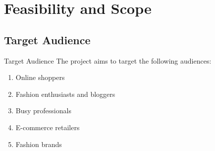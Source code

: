 \section{Feasibility and Scope}

\subsection{Target Audience}
\begin{frame}{Target Audience}
	The project aims to target the following audiences:
	\begin{enumerate}
		\item Online shoppers
		\item Fashion enthusiasts and bloggers
		\item Busy professionals
		\item E-commerce retailers
		\item Fashion brands
	\end{enumerate}
\end{frame}

